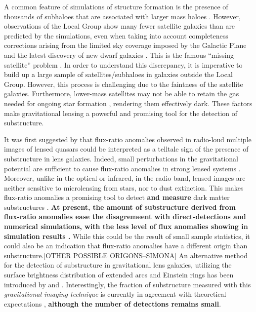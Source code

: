 \documentclass[useAMS,usenatbib]{mn2e}
\begin{document}
A common feature of simulations of structure formation is the presence
of thousands of subhaloes that are associated with larger mass haloes \citep[e.g.][]{Springel08}.
However, observations of the Local Group show many fewer satellite
galaxies than are predicted by the simulations, even when taking into
account completeness corrections arising from the limited sky coverage
imposed by the Galactic Plane and the latest discovery of new dwarf galaxies \citep{DES15,Kop15}.  
This is the famous ``missing satellite'' problem \citep{Klypin1999, Moore1999, S07}. In order to
understand this discrepancy, it is imperative to build up a large
sample of satellites/subhaloes in galaxies outside the Local Group.
 However, this process is challenging due to the faintness of the satellite
galaxies.  Furthermore, lower-mass satellites may not be able to
retain the gas needed for ongoing star formation \citep[e.g.][]{P11},
rendering them effectively dark.  These factors make gravitational
lensing a powerful and promising tool for the detection of
substructure.

It was first suggested by \citet{Mao1998} that flux-ratio anomalies
observed in radio-loud multiple images of lensed quasars could be
interpreted as a telltale sign of the presence of substructure in lens
galaxies.  Indeed, small perturbations in the gravitational potential
are sufficient to cause flux-ratio anomalies in strong lensed systems
\citep{Bradac02}.  Moreover, unlike in the optical or infrared, in the
radio band, lensed images are neither sensitive to microlensing from
stars, nor to dust extinction. This makes flux-ratio anomalies a promising
tool to detect \textbf{and measure} dark matter substructures \citep{Dalal2002,N13}.  
\textbf{At present, the amount of substructure derived from flux-ratio anomalies ease the disagremeent with direct-detections and numerical simulations, with the less level of flux anomalies showing in simulation results \citep{Xu14}.}
While this could be the result of small sample
statistics, it could also be an indication that flux-ratio anomalies
have a different origin than substructure.[OTHER POSSIBLE ORIGONS--SIMONA]
%
An alternative method for
the detection of substructure in gravitational lens galaxies, utilizing
the surface brightness distribution of extended arcs and Einstein rings
has been introduced by \citet{K05} and \citet{V09}. Interestingly, the fraction of
substructure measured with this \emph{gravitational imaging technique}
is currently in agreement with theoretical expectations \citep{V14a,V12}, \textbf{although the number of detections remains small}.
\end{document}
